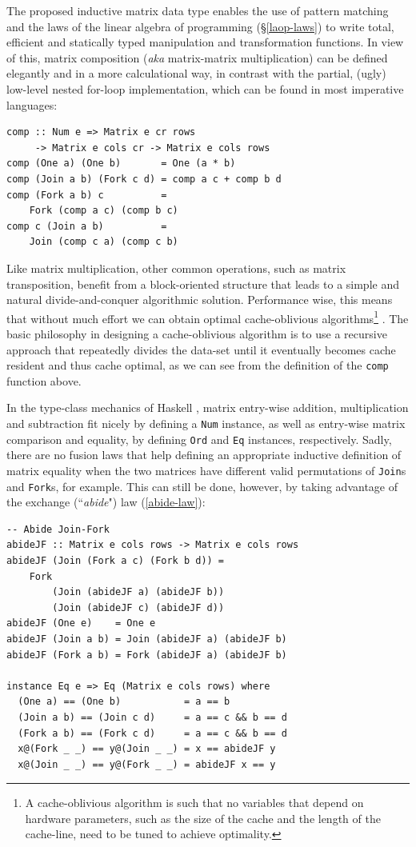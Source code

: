 \documentclass[sigplan,screen]{acmart}
\newcommand{\hs}{\texttt}
\begin{document}
The proposed inductive matrix data type enables the use of pattern matching and the laws of the linear algebra of programming (\S\ref{laop-laws}) to write total, efficient and statically typed manipulation and transformation functions. In view of this, matrix composition (\emph{aka} matrix-matrix multiplication) can be defined elegantly and in a more calculational way, in contrast with the partial, (ugly) low-level nested for-loop implementation, which can be found in most imperative languages:
\begin{verbatim}
comp :: Num e => Matrix e cr rows 
     -> Matrix e cols cr -> Matrix e cols rows
comp (One a) (One b)       = One (a * b)
comp (Join a b) (Fork c d) = comp a c + comp b d
comp (Fork a b) c          = 
    Fork (comp a c) (comp b c)
comp c (Join a b)          = 
    Join (comp c a) (comp c b)
\end{verbatim}
Like matrix multiplication, other common operations, such as matrix transposition, benefit from a block-oriented structure that leads to a simple and natural divide-and-conquer algorithmic solution. Performance wise, this means that without much effort we can obtain optimal cache-oblivious algorithms\footnote{A cache-oblivious algorithm is such that no variables that depend on hardware parameters, such as the size of the cache and the length of the cache-line, need to be tuned to achieve optimality.} \citep{frigo1999cache}. The basic philosophy in designing a cache-oblivious algorithm is to use a recursive approach that repeatedly divides the data-set until it eventually becomes cache resident and thus cache optimal, as we can see from the definition of the \hs{comp} function above.

In the type-class mechanics of Haskell \cite{hall1996type}, matrix entry-wise addition, multiplication and subtraction fit nicely by defining a \hs{Num} instance, as well as entry-wise matrix comparison and equality, by defining \hs{Ord} and \hs{Eq} instances, respectively. Sadly, there are no fusion laws that help defining an appropriate inductive definition of matrix equality when the two matrices have different valid permutations of \hs{Join}s and \hs{Fork}s, for example. This can still be done, however, by taking advantage of the exchange (``\emph{abide}") law (\ref{abide-law}):

\vspace{1mm}
\begin{verbatim}
-- Abide Join-Fork
abideJF :: Matrix e cols rows -> Matrix e cols rows
abideJF (Join (Fork a c) (Fork b d)) = 
    Fork 
        (Join (abideJF a) (abideJF b)) 
        (Join (abideJF c) (abideJF d))
abideJF (One e)    = One e
abideJF (Join a b) = Join (abideJF a) (abideJF b)
abideJF (Fork a b) = Fork (abideJF a) (abideJF b)

instance Eq e => Eq (Matrix e cols rows) where
  (One a) == (One b)           = a == b
  (Join a b) == (Join c d)     = a == c && b == d
  (Fork a b) == (Fork c d)     = a == c && b == d
  x@(Fork _ _) == y@(Join _ _) = x == abideJF y
  x@(Join _ _) == y@(Fork _ _) = abideJF x == y
\end{verbatim}
\vspace{1mm}
\end{document}
